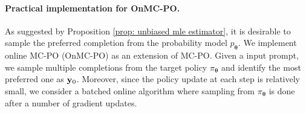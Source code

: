 \paragraph{Practical implementation for OnMC-PO.}
As suggested by Proposition \ref{prop: unbiased mle estimator},
it is desirable to sample the preferred completion from the probability model $p_{\boldsymbol\theta}$.
We implement online MC-PO (OnMC-PO) as an extension of MC-PO.
Given a input prompt,
we sample multiple completions from the target policy $\pi_{\boldsymbol\theta}$ and identify the most preferred one as $\mathbf{y}_0$.
Moreover,
since the policy update at each step is relatively small,
we consider a batched online algorithm \citep{rosset2024direct} where sampling from $\pi_{\boldsymbol\theta}$ is done after a number of gradient updates.
